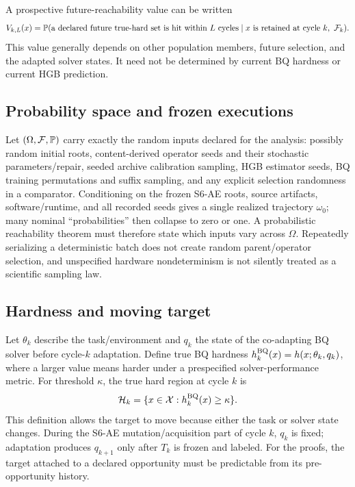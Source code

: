 A prospective future-reachability value can be written
\[
 V_{k,L}(x)=\mathbb{P}(\text{a declared future true-hard set is hit within $L$
 cycles}\mid x\text{ is retained at cycle }k,\ \mathcal F_k).
\]
This value generally depends on other population members, future selection,
and the adapted solver states. It need not be determined by current BQ
hardness or current HGB prediction.

\subsection{Probability space and frozen executions}
Let $(\Omega,\mathcal{F},\mathbb{P})$ carry exactly the random inputs declared for
the analysis: possibly random initial roots, content-derived operator seeds
and their stochastic parameters/repair, seeded archive calibration sampling,
HGB estimator seeds, BQ training permutations and suffix sampling, and any
explicit selection randomness in a comparator. Conditioning on the frozen
S6-AE roots, source artifacts, software/runtime, and all recorded seeds gives
a single realized trajectory $\omega_0$; many nominal ``probabilities'' then
collapse to zero or one. A probabilistic reachability theorem must therefore
state which inputs vary across $\Omega$. Repeatedly serializing a deterministic
batch does not create random parent/operator selection, and unspecified
hardware nondeterminism is not silently treated as a scientific sampling law.

\subsection{Hardness and moving target}
Let $\theta_k$ describe the task/environment and $q_k$ the state of the
co-adapting BQ solver before cycle-$k$ adaptation. Define true BQ hardness
$h_k^{\rm BQ}(x)=h(x;\theta_k,q_k)$,
where a larger value means harder under a prespecified solver-performance
metric. For threshold $\kappa$, the true hard region at cycle $k$ is
\[
 \mathcal{H}_k=\{x\in\mathcal{X}:h_k^{\rm BQ}(x)\geq\kappa\}.
\]
This definition allows the target to move because either the task or solver
state changes. During the S6-AE mutation/acquisition part of cycle $k$, $q_k$
is fixed; adaptation produces $q_{k+1}$ only after $T_k$ is frozen and labeled.
For the proofs, the target attached to a declared opportunity must be
predictable from its pre-opportunity history.

